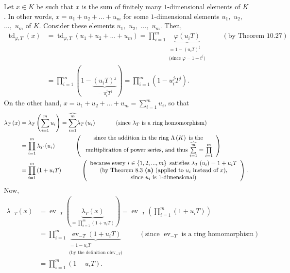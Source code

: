 \documentclass[numbers=enddot,12pt,final,onecolumn,notitlepage]{scrartcl}%
\begin{document}
Let $x\in K$ be such that $x$ is the sum of finitely many $1$-dimensional
elements of $K$. In other words, $x=u_{1}+u_{2}+...+u_{m}$ for some
$1$-dimensional elements $u_{1},$ $u_{2},$ $...,$ $u_{m}$ of $K$. Consider
these elements $u_{1},$ $u_{2},$ $...,$ $u_{m}$. Then,%
\begin{align*}
\operatorname*{td}\nolimits_{\varphi,T}\left(  x\right)   &
=\operatorname*{td}\nolimits_{\varphi,T}\left(  u_{1}+u_{2}+...+u_{m}\right)
=\prod\limits_{i=1}^{m}\underbrace{\varphi\left(  u_{i}T\right)
}_{\substack{=1-\left(  u_{i}T\right)  ^{j}\\\text{(since }\varphi
=1-t^{j}\text{)}}}\ \ \ \ \ \ \ \ \ \ \left(  \text{by Theorem 10.27}\right)
\\
&  =\prod\limits_{i=1}^{m}\left(  1-\underbrace{\left(  u_{i}T\right)  ^{j}%
}_{=u_{i}^{j}T^{j}}\right)  =\prod\limits_{i=1}^{m}\left(  1-u_{i}^{j}%
T^{j}\right)  .
\end{align*}
On the other hand, $x=u_{1}+u_{2}+...+u_{m}=\sum\limits_{i=1}^{m}u_{i}$, so
that%
\begin{align*}
\lambda_{T}\left(  x\right)   &  =\lambda_{T}\left(  \sum\limits_{i=1}%
^{m}u_{i}\right)  =\widehat{\sum\limits_{i=1}^{m}}\lambda_{T}\left(
u_{i}\right)  \ \ \ \ \ \ \ \ \ \ \left(  \text{since }\lambda_{T}\text{ is a
ring homomorphism}\right) \\
&  =\prod\limits_{i=1}^{m}\lambda_{T}\left(  u_{i}\right)
\ \ \ \ \ \ \ \ \ \ \left(
\begin{array}
[c]{c}%
\text{since the addition in the ring }\Lambda\left(  K\right)  \text{ is
the}\\
\text{ multiplication of power series, and thus }\widehat{\sum\limits_{i=1}%
^{m}}=\prod\limits_{i=1}^{m}%
\end{array}
\right) \\
&  =\prod\limits_{i=1}^{m}\left(  1+u_{i}T\right)  \ \ \ \ \ \ \ \ \ \ \left(
%
\begin{array}
[c]{c}%
\text{because every }i\in\left\{  1,2,...,m\right\}  \text{ satisfies }%
\lambda_{T}\left(  u_{i}\right)  =1+u_{i}T\\
\text{(by Theorem 8.3 \textbf{(a)} (applied to }u_{i}\text{ instead of
}x\text{),}\\
\text{since }u_{i}\text{ is }1\text{-dimensional)}%
\end{array}
\right)  .
\end{align*}
Now,%
\begin{align*}
\lambda_{-T}\left(  x\right)   &  =\operatorname*{ev}\nolimits_{-T}\left(
\underbrace{\lambda_{T}\left(  x\right)  }_{=\prod\limits_{i=1}^{m}\left(
1+u_{i}T\right)  }\right)  =\operatorname*{ev}\nolimits_{-T}\left(
\prod\limits_{i=1}^{m}\left(  1+u_{i}T\right)  \right) \\
&  =\prod\limits_{i=1}^{m}\underbrace{\operatorname*{ev}\nolimits_{-T}\left(
1+u_{i}T\right)  }_{\substack{=1-u_{i}T\\\text{(by the definition of
}\operatorname*{ev}\nolimits_{-T}\text{)}}}\ \ \ \ \ \ \ \ \ \ \left(
\text{since }\operatorname*{ev}\nolimits_{-T}\text{ is a ring homomorphism}%
\right) \\
&  =\prod\limits_{i=1}^{m}\left(  1-u_{i}T\right)  .
\end{align*}
\end{document}
